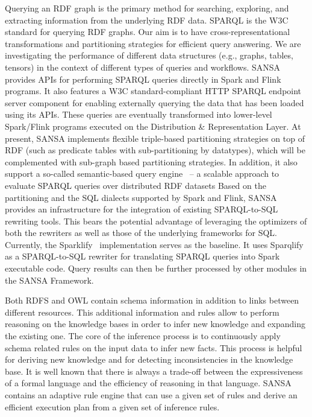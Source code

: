 Querying an \gls{RDF} graph is the primary method for searching, exploring, and extracting information from the underlying \gls{RDF} data.
\gls{SPARQL} is the \gls{W3C} standard for querying \gls{RDF} graphs.
Our aim is to have cross-representational transformations and partitioning strategies for efficient query answering. We are investigating the performance of different data structures (e.g., graphs, tables, tensors) in the context of different types of queries and workflows.
SANSA provides \gls{API}s for performing \gls{SPARQL} queries directly in Spark and Flink programs.
It also features a \gls{W3C} standard-compliant HTTP \gls{SPARQL} endpoint server component for enabling externally querying the data that has been loaded using its \gls{API}s. These queries are eventually transformed into lower-level Spark/Flink programs executed on the Distribution \& Representation Layer.
At present, SANSA implements flexible triple-based partitioning strategies on top of \gls{RDF} (such as predicate tables with sub-partitioning by datatypes), which will be complemented with sub-graph based partitioning strategies.
In addition, it also support a so-called semantic-based query engine~\cite{sejdiu-2019-sansa-semantic-based-semantics} -- a scalable approach to evaluate \gls{SPARQL} queries over distributed \gls{RDF} datasets
Based on the partitioning and the SQL dialects supported by Spark and Flink, SANSA provides an infrastructure for the integration of existing SPARQL-to-SQL rewriting tools. 
This bears the potential advantage of leveraging the optimizers of both the rewriters as well as those of the underlying frameworks for SQL.
Currently, the Sparklify~\cite{2019-sansa-sparklify-iswc} implementation serves as the baseline.
It uses Sparqlify as a SPARQL-to-SQL rewriter for translating \gls{SPARQL} queries into Spark executable code.
Query results can then be further processed by other modules in the SANSA Framework.

Both \gls{RDFS} and \gls{OWL} contain schema information in addition to links between different resources. 
This additional information and rules allow to perform reasoning on the knowledge bases in order to infer new knowledge and expanding the existing one. 
The core of the inference process is to continuously apply schema related rules on the input data to infer new facts. 
This process is helpful for deriving new knowledge and for detecting inconsistencies in the knowledge base.
It is well known that there is always a trade-off between the expressiveness of a formal language and the efficiency of reasoning in that language. 
SANSA contains an adaptive rule engine that can use a given set of rules and derive an efficient execution plan from a given set of inference rules.

